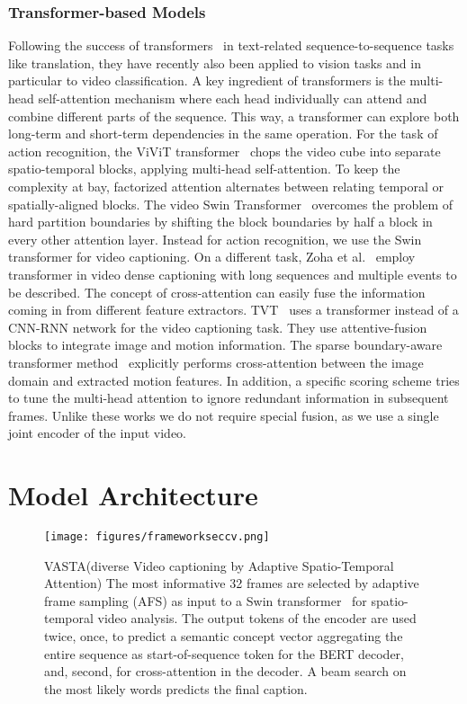 \documentclass[runningheads,table]{llncs}
\newcommand{\modelName}{VASTA\xspace}
\begin{document}
\subsubsection{Transformer-based Models}
Following the success of transformers~\cite{vaswani2017attention} in text-related sequence-to-sequence tasks like translation, they have recently also been applied to vision tasks and in particular to video classification. 
A key ingredient of transformers is the multi-head self-attention mechanism where each head individually can attend and combine different parts of the sequence. This way, a transformer can explore both long-term and short-term dependencies in the same operation. 
For the task of action recognition, the ViViT transformer~\cite{arnab2021vivit} chops the video cube into separate spatio-temporal blocks, applying multi-head self-attention. To keep the complexity at bay, factorized attention alternates between relating temporal or spatially-aligned blocks. 
The video Swin Transformer~\cite{liu2021video} overcomes the problem of hard partition boundaries by shifting the block boundaries by half a block in every other attention layer. 
Instead for action recognition, we use the Swin transformer for video captioning.
On a different task, Zoha et al.\ \cite{zhou2018end} employ transformer in video dense captioning with long sequences and multiple events to be described. 
The concept of cross-attention can easily fuse the information coming in from different feature extractors. 
TVT~\cite{chen2018tvt} uses a transformer instead of a CNN-RNN network for the video captioning task. They use attentive-fusion blocks to integrate image and motion information.
The sparse boundary-aware transformer method~\cite{jin2020sbat} explicitly performs cross-attention between the image domain and extracted motion features. In addition, a specific scoring scheme tries to tune the multi-head attention to ignore redundant information in subsequent frames.
Unlike these works we do not require special fusion, as we use a single joint encoder of the input video.


 \section{Model Architecture}

\begin{figure}[t]
\centerline{
\texttt{[image: figures/frameworkseccv.png]}}
 \vspace{-0.3cm}
  \caption{
    \modelName (diverse Video captioning by Adaptive Spatio-Temporal Attention) The most informative 32 frames are selected by adaptive frame sampling (AFS) as input to a Swin transformer~\cite{liu2021video} for spatio-temporal video analysis. The output tokens of the encoder are used twice, once, to predict a semantic concept vector aggregating the entire sequence as start-of-sequence token for the BERT decoder, and, second, for cross-attention in the decoder. A beam search on the most likely words predicts the final caption. }
\label{fig:model_figure}
\end{figure}
\end{document}
